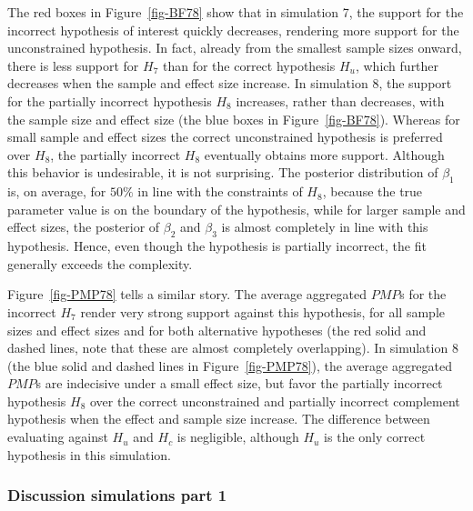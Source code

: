 \documentclass[
]{interact}
\begin{document}
The red boxes in Figure~\ref{fig-BF78} show that in simulation 7, the
support for the incorrect hypothesis of interest quickly decreases,
rendering more support for the unconstrained hypothesis. In fact,
already from the smallest sample sizes onward, there is less support for
\(H_7\) than for the correct hypothesis \(H_u\), which further decreases
when the sample and effect size increase. In simulation 8, the support
for the partially incorrect hypothesis \(H_8\) increases, rather than
decreases, with the sample size and effect size (the blue boxes in
Figure~\ref{fig-BF78}). Whereas for small sample and effect sizes the
correct unconstrained hypothesis is preferred over \(H_8\), the
partially incorrect \(H_8\) eventually obtains more support. Although
this behavior is undesirable, it is not surprising. The posterior
distribution of \(\beta_1\) is, on average, for \(50\%\) in line with
the constraints of \(H_8\), because the true parameter value is on the
boundary of the hypothesis, while for larger sample and effect sizes,
the posterior of \(\beta_2\) and \(\beta_3\) is almost completely in
line with this hypothesis. Hence, even though the hypothesis is
partially incorrect, the fit generally exceeds the complexity.

Figure~\ref{fig-PMP78} tells a similar story. The average aggregated
\(PMP\)s for the incorrect \(H_7\) render very strong support against
this hypothesis, for all sample sizes and effect sizes and for both
alternative hypotheses (the red solid and dashed lines, note that these
are almost completely overlapping). In simulation 8 (the blue solid and
dashed lines in Figure~\ref{fig-PMP78}), the average aggregated \(PMP\)s
are indecisive under a small effect size, but favor the partially
incorrect hypothesis \(H_8\) over the correct unconstrained and
partially incorrect complement hypothesis when the effect and sample
size increase. The difference between evaluating against \(H_u\) and
\(H_c\) is negligible, although \(H_u\) is the only correct hypothesis
in this simulation.

\hypertarget{discussion-simulations-part-1}{%
\subsubsection{Discussion simulations part
1}\label{discussion-simulations-part-1}}
\end{document}
